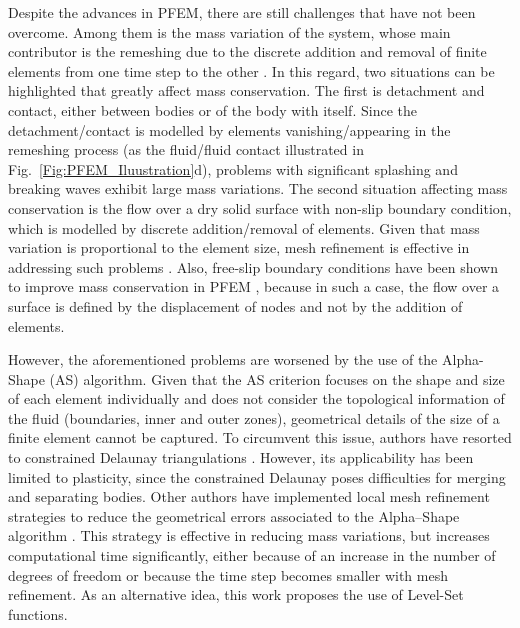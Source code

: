 \documentclass[final,3p,times]{elsarticle}
\begin{document}
Despite the advances in PFEM, there are still challenges that have not been overcome. Among them is the mass variation of the system, whose main contributor is the remeshing due to the discrete addition and removal of finite elements from one time step to the other \citep{franci2017effect}. In this regard, two situations can be highlighted that greatly affect mass conservation. The first is detachment and contact, either between bodies or of the body with itself. Since the detachment/contact is modelled by elements vanishing/appearing in the remeshing process (as the fluid/fluid contact illustrated in Fig.~\ref{Fig:PFEM_Iluustration}d), problems with significant splashing and breaking waves exhibit large mass variations. The second situation affecting mass conservation is the flow over a dry solid surface with non-slip boundary condition, which is modelled by discrete addition/removal of elements. Given that mass variation is proportional to the element size, mesh refinement is effective in addressing such problems \citep{franci2017effect,cerquaglia2019development}. Also, free-slip boundary conditions have been shown to improve mass conservation in PFEM \citep{cerquaglia2017free}, because in such a case, the flow over a surface is defined by the displacement of nodes and not by the addition of elements.   

However, the aforementioned problems are worsened by the use of the Alpha-Shape (AS) algorithm. Given that the AS criterion focuses on the shape and size of each element individually and does not consider the topological information of the fluid (boundaries, inner and outer zones), geometrical details of the size of a finite element cannot be captured. To circumvent this issue, authors have resorted to constrained Delaunay triangulations \citep{carbonell2020modelling,rodriguez2017continuous}. However, its applicability has been limited to plasticity, since the constrained Delaunay poses difficulties for merging and separating bodies. Other authors have implemented local mesh refinement strategies to reduce the geometrical errors associated to the Alpha--Shape algorithm \citep{bobach2021phase,falla2022Mesh}. This strategy is effective in reducing mass variations, but increases computational time significantly, either because of an increase in the number of degrees of freedom or because the time step becomes smaller with mesh refinement. As an alternative idea, this work proposes the use of Level-Set functions.
\end{document}

